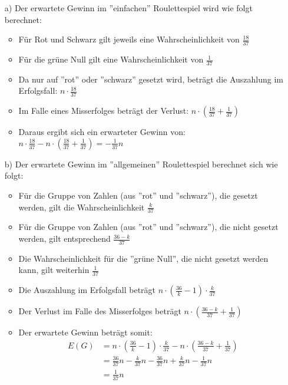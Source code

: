 \begin{enumerate}
	\item[a)] Der erwartete Gewinn im ''einfachen'' Roulettespiel wird wie folgt berechnet:
	\begin{itemize}
		\item Für Rot und Schwarz gilt jeweils eine Wahrscheinlichkeit von $\frac{18}{37} $
		\item Für die grüne Null gilt eine Wahrscheinlichkeit von $\frac{1}{37}$
		\item Da nur auf ''rot'' oder ''schwarz'' gesetzt wird, beträgt die Auszahlung im Erfolgsfall: $n \cdot \frac{18}{37}$
		\item Im Falle eines Misserfolges beträgt der Verlust: $ n \cdot (\frac{18}{37}+\frac{1}{37})$
		\item Daraus ergibt sich ein erwarteter Gewinn von: $ n \cdot \frac{18}{37} - n \cdot (\frac{18}{37}+\frac{1}{37}) = -\frac{1}{37}n$
		
	\end{itemize}
	\item[b)] Der erwartete Gewinn im ''allgemeinen'' Roulettespiel berechnet sich wie folgt:
	\begin{itemize}
		\item Für die Gruppe von Zahlen (aus ''rot'' und ''schwarz''), die gesetzt werden, gilt die Wahrscheinlichkeit $\frac{k}{37}$
		\item Für die Gruppe von Zahlen (aus ''rot'' und ''schwarz''), die nicht gesetzt werden, gilt entsprechend $\frac{36-k}{37}$
		\item Die Wahrscheinlichkeit für die ''grüne Null'', die nicht gesetzt werden kann, gilt weiterhin $\frac{1}{37}$
		\item Die Auszahlung im Erfolgsfall beträgt $n\cdot (\frac{36}{k}-1)\cdot \frac{k}{37}$
		\item Der Verlust im Falle des Misserfolges beträgt $n\cdot (\frac{36-k}{37}+\frac{1}{37})$
		\item Der erwartete Gewinn beträgt somit:
		\begin{equation*}
			\begin{split}
				E(G)	&= n\cdot (\frac{36}{k}-1)\cdot \frac{k}{37} - n\cdot (\frac{36-k}{37}+\frac{1}{37})\\
						&= \frac{36}{37}n - \frac{k}{37}n - \frac{36}{37}n + \frac{k}{37}n - \frac{1}{37}n\\
						&= \frac{1}{37}n
			\end{split}
		\end{equation*}
	\end{itemize}
	

\end{enumerate}
